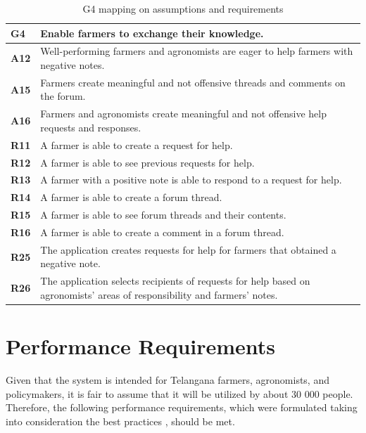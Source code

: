 \begin{table}[H]
    \centering
    \begin{tabularx}{\linewidth}{lX} \toprule
         \textbf{G4} & Enable farmers to exchange their knowledge. \\ \midrule
         \textbf{A12} &  Well-performing farmers and agronomists are eager to help farmers with negative notes.\\ 
         \textbf{A15} & Farmers create meaningful and not offensive threads and comments on the forum.\\
         \textbf{A16} & Farmers and agronomists create meaningful and not offensive help requests and responses. \\
         \midrule
          \textbf{R11} &  A farmer is able to create a request for help. \\
          \textbf{R12} & A farmer is able to see previous requests for help. \\
          \textbf{R13} & A farmer with a positive note is able to respond to a request for help. \\
          \textbf{R14} & A farmer is able to create a forum thread. \\
		 \textbf{R15} & A farmer is able to see forum threads and their contents. \\
		 \textbf{R16} & A farmer is able to create a comment in a forum thread. \\ 
          \textbf{R25} & The application creates requests for help for farmers that obtained a negative note. \\
          \textbf{R26} &  The application selects recipients of requests for help based on agronomists' areas of responsibility and farmers' notes. \\
         \bottomrule
    \end{tabularx}
    \caption{G4 mapping on assumptions and requirements}
\end{table}

\section{Performance Requirements} \label{sec:performance_requirements}

Given that the system is intended for Telangana farmers, agronomists, and policymakers, it is fair to assume that it will be utilized by about 30 000 people. Therefore, the following performance requirements, which were formulated taking into consideration the best practices \cite{performance_requirements}, should be met.

